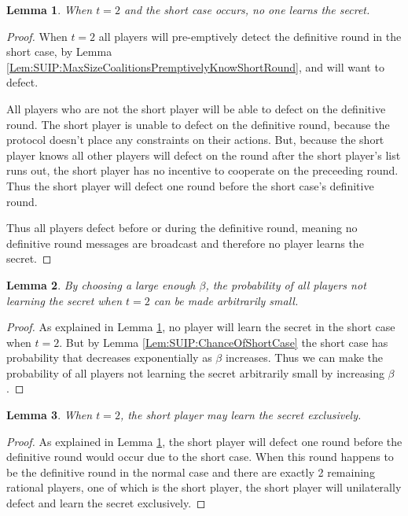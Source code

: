 \documentclass{dalcsthesis}
\newtheorem{lemma}{Lemma}
\begin{document}
\begin{lemma} When $t=2$ and the short case occurs, no one learns the secret. \label{Lem:SUIP:MinimumThresholdAndShortCaseMeansNoOneLearnsSecret} \end{lemma}
\begin{proof}
When $t=2$ all players will pre-emptively detect the definitive round in the short case, by Lemma \ref{Lem:SUIP:MaxSizeCoalitionsPremptivelyKnowShortRound}, and will want to defect.

All players who are not the short player will be able to defect on the definitive round. The short player is unable to defect on the definitive round, because the protocol doesn't place any constraints on their actions. But, because the short player knows all other players will defect on the round after the short player's list runs out, the short player has no incentive to cooperate on the preceeding round. Thus the short player will defect one round before the short case's definitive round.

Thus all players defect before or during the definitive round, meaning no definitive round messages are broadcast and therefore no player learns the secret.
\end{proof}

\begin{lemma} By choosing a large enough $\beta$, the probability of all players not learning the secret when $t=2$ can be made arbitrarily small. \label{Lem:SUIP:NoPlayerLearningSecretIsReducible} \end{lemma} 
\begin{proof}
As explained in Lemma \ref{Lem:SUIP:MinimumThresholdAndShortCaseMeansNoOneLearnsSecret}, no player will learn the secret in the short case when $t=2$. But by Lemma \ref{Lem:SUIP:ChanceOfShortCase} the short case has probability that decreases exponentially as $\beta$ increases. Thus we can make the probability of all players not learning the secret arbitrarily small by increasing $\beta$.
\end{proof}

\begin{lemma} When $t=2$, the short player may learn the secret exclusively. \label{Lem:SUIP:ShortPlayerMayLearnSecretExclusively} \end{lemma} 
\begin{proof}
As explained in Lemma \ref{Lem:SUIP:MinimumThresholdAndShortCaseMeansNoOneLearnsSecret}, the short player will defect one round before the definitive round would occur due to the short case. When this round happens to be the definitive round in the normal case and there are exactly 2 remaining rational players, one of which is the short player, the short player will unilaterally defect and learn the secret exclusively.
\end{proof}
\end{document}
